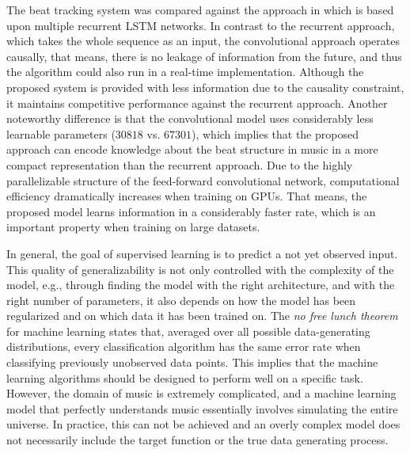 \documentclass{scrartcl}
\begin{document}
The beat tracking system was compared against the approach in \cite{Boeck2014} which is based upon multiple recurrent LSTM networks. In contrast to the recurrent approach, which takes the whole sequence as an input, the convolutional approach operates causally, that means, there is no leakage of information from the future, and thus the algorithm could also run in a real-time implementation. Although the proposed system is provided with less information due to the causality constraint, it maintains competitive performance against the recurrent approach. Another noteworthy difference is that the convolutional model uses considerably less learnable parameters ($\num{30818}$ vs. $\num{67301}$), which implies that the proposed approach can encode knowledge about the beat structure in music in a more compact representation than the recurrent approach. Due to the highly parallelizable structure of the feed-forward convolutional network, computational efficiency dramatically increases when training on GPUs. That means, the proposed model learns information in a considerably faster rate, which is an important property when training on large datasets. 


In general, the goal of supervised learning is to predict a not yet observed input. This quality of generalizability is not only controlled with the complexity of the model, e.g., through finding the model with the right architecture, and with the right number of parameters, it also depends on how the model has been regularized and on which data it has been trained on. The \emph{no free lunch theorem} for machine learning \cite{Wolpert1996} states that, averaged over all possible data-generating distributions, every classification algorithm has the same error rate when classifying previously unobserved data points. This implies that the machine learning algorithms should be designed to perform well on a specific task. However, the domain of music is extremely complicated, and a machine learning model that perfectly understands music essentially involves simulating the entire universe. In practice, this can not be achieved and an overly complex model does not necessarily include the target function or the true data generating process. 
\end{document}
